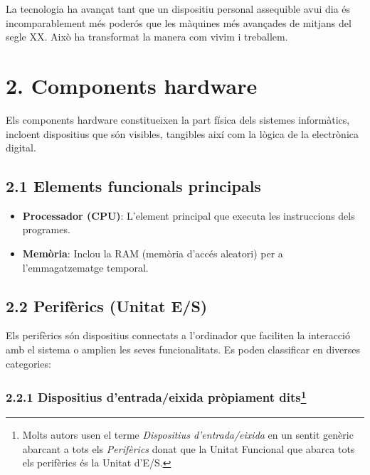 \documentclass[
  12 pt,
  a4paper,
]{article}
\providecommand{\tightlist}{%
  \setlength{\itemsep}{0pt}\setlength{\parskip}{0pt}}
\begin{document}
La tecnologia ha avançat tant que un dispositiu personal assequible avui
dia és incomparablement més poderós que les màquines més avançades de
mitjans del segle XX. Això ha transformat la manera com vivim i
treballem.

\section{2. Components hardware}\label{components-hardware}

Els components hardware constitueixen la part física dels sistemes
informàtics, incloent dispositius que són visibles, tangibles així com
la lògica de la electrònica digital.

\subsection{2.1 Elements funcionals
principals}\label{elements-funcionals-principals}

\begin{itemize}
\tightlist
\item
  \textbf{Processador (CPU)}: L'element principal que executa les
  instruccions dels programes.
\item
  \textbf{Memòria}: Inclou la RAM (memòria d'accés aleatori) per a
  l'emmagatzematge temporal.
\end{itemize}

\subsection{2.2 Perifèrics (Unitat E/S)}\label{perifuxe8rics-unitat-es}

Els perifèrics són dispositius connectats a l'ordinador que faciliten la
interacció amb el sistema o amplien les seves funcionalitats. Es poden
classificar en diverses categories:

\subsubsection[2.2.1 Dispositius d'entrada/eixida pròpiament
dits]{\texorpdfstring{2.2.1 Dispositius d'entrada/eixida pròpiament
dits\footnote{Molts autors usen el terme \emph{Dispositius
  d'entrada/eixida} en un sentit genèric abarcant a tots els
  \emph{Perifèrics} donat que la Unitat Funcional que abarca tots els
  perifèrics és la Unitat d'E/S.}}{2.2.1 Dispositius d'entrada/eixida pròpiament dits}}\label{dispositius-dentradaeixida-pruxf2piament-dits1}
\end{document}
